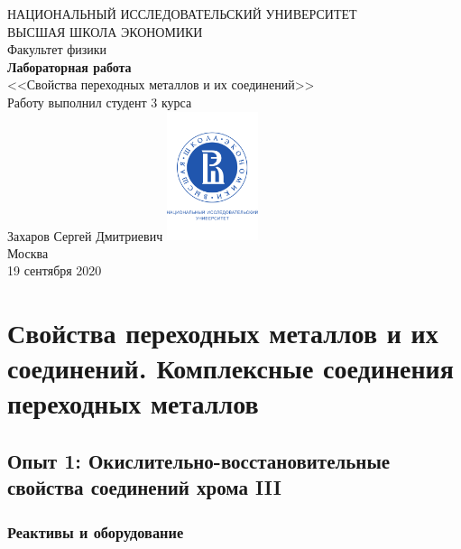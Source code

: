\documentclass[a4paper, 12pt]{article}
\begin{document}
	\begin{titlepage}
		\begin{center}
			$$$$
			$$$$
			$$$$
			$$$$
			{\Large{НАЦИОНАЛЬНЫЙ ИССЛЕДОВАТЕЛЬСКИЙ УНИВЕРСИТЕТ}}\\
			\vspace{0.1cm}
			{\Large{ВЫСШАЯ ШКОЛА ЭКОНОМИКИ}}\\
			\vspace{0.25cm}
			{\large{Факультет физики}}\\
			\vspace{5.5cm}
			{\Huge\textbf{{Лабораторная работа}}}\\%
			\vspace{1cm}
			{\LARGE{<<Свойства переходных металлов и их соединений>>}}\\%
			\vspace{2cm}
			{Работу выполнил студент 3 курса}\\
			{Захаров Сергей Дмитриевич}
			\vfill
			\includegraphics[width = 0.2\textwidth]{HSElogo}\\
			\vfill
			Москва\\
			19 сентября 2020
		\end{center}
	\end{titlepage}

\tableofcontents

\newpage


\section{Свойства переходных металлов и их соединений. Комплексные соединения переходных металлов}

\subsection{Опыт 1: Окислительно-восстановительные свойства соединений хрома III}

\subsubsection{Реактивы и оборудование}
\end{document}
